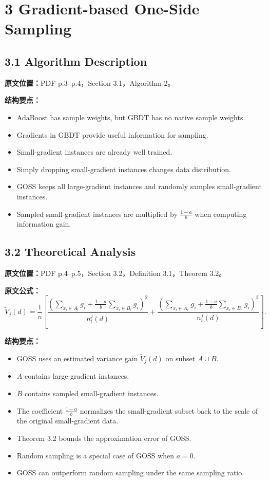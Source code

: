 \section{3 Gradient-based One-Side Sampling}

\subsection{3.1 Algorithm Description}

\textbf{原文位置：}PDF p.3--p.4，Section 3.1，Algorithm 2。

\textbf{结构要点：}
\begin{itemize}
  \item AdaBoost has sample weights, but GBDT has no native sample weights.
  \item Gradients in GBDT provide useful information for sampling.
  \item Small-gradient instances are already well trained.
  \item Simply dropping small-gradient instances changes data distribution.
  \item GOSS keeps all large-gradient instances and randomly samples small-gradient instances.
  \item Sampled small-gradient instances are multiplied by $\frac{1-a}{b}$ when computing information gain.
\end{itemize}

\subsection{3.2 Theoretical Analysis}

\textbf{原文位置：}PDF p.4--p.5，Section 3.2，Definition 3.1，Theorem 3.2。

\textbf{原文公式：}
\[
  \tilde{V}_j(d)
  =
  \frac{1}{n}
  \left[
    \frac{
      \left(
        \sum_{x_i\in A_l}g_i
        +
        \frac{1-a}{b}\sum_{x_i\in B_l}g_i
      \right)^2
    }{n_l^j(d)}
    +
    \frac{
      \left(
        \sum_{x_i\in A_r}g_i
        +
        \frac{1-a}{b}\sum_{x_i\in B_r}g_i
      \right)^2
    }{n_r^j(d)}
  \right].
\]

\textbf{结构要点：}
\begin{itemize}
  \item GOSS uses an estimated variance gain $\tilde{V}_j(d)$ on subset $A\cup B$.
  \item $A$ contains large-gradient instances.
  \item $B$ contains sampled small-gradient instances.
  \item The coefficient $\frac{1-a}{b}$ normalizes the small-gradient subset back to the scale of the original small-gradient data.
  \item Theorem 3.2 bounds the approximation error of GOSS.
  \item Random sampling is a special case of GOSS when $a=0$.
  \item GOSS can outperform random sampling under the same sampling ratio.
\end{itemize}

